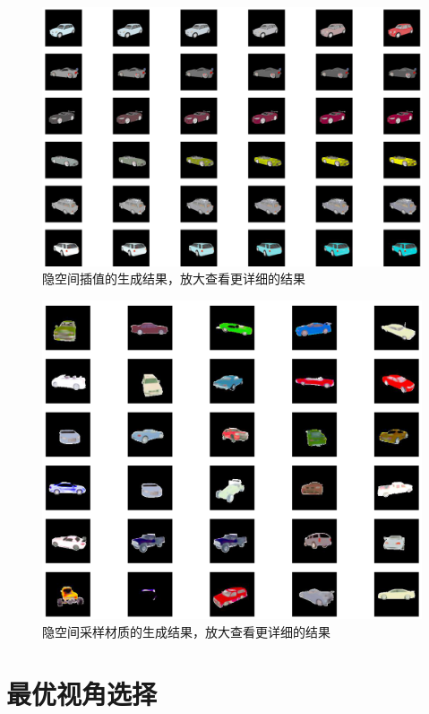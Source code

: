 \documentclass[UTF8,openany,AutoFakeBold,AutoFakeSlant,cs4size]{ctexbook}
\begin{document}
\begin{figure}
\centering
\includegraphics[width=\linewidth]{./images/syn_interpolate_thesis.png}
\caption{隐空间插值的生成结果，放大查看更详细的结果}
\label{result_interpolate}
\end{figure}

\begin{figure}
\centering
\includegraphics[width=\linewidth]{./images/random_SPADE_thesis.png}
\caption{隐空间采样材质的生成结果，放大查看更详细的结果}
\label{fig:sample}
\end{figure}


\section{最优视角选择}
\end{document}
